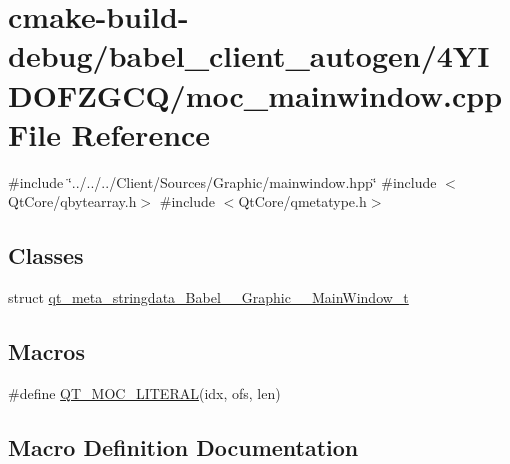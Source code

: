 \hypertarget{cmake-build-debug_2babel__client__autogen_24YIDOFZGCQ_2moc__mainwindow_8cpp}{}\section{cmake-\/build-\/debug/babel\+\_\+client\+\_\+autogen/4\+Y\+I\+D\+O\+F\+Z\+G\+C\+Q/moc\+\_\+mainwindow.cpp File Reference}
\label{cmake-build-debug_2babel__client__autogen_24YIDOFZGCQ_2moc__mainwindow_8cpp}
{\ttfamily \#include \char`\"{}../../../\+Client/\+Sources/\+Graphic/mainwindow.\+hpp\char`\"{}}\newline
{\ttfamily \#include $<$Qt\+Core/qbytearray.\+h$>$}\newline
{\ttfamily \#include $<$Qt\+Core/qmetatype.\+h$>$}\newline
\subsection*{Classes}
\begin{DoxyCompactItemize}
\item 
struct \hyperlink{structqt__meta__stringdata__Babel____Graphic____MainWindow__t}{qt\+\_\+meta\+\_\+stringdata\+\_\+\+Babel\+\_\+\+\_\+\+Graphic\+\_\+\+\_\+\+Main\+Window\+\_\+t}
\end{DoxyCompactItemize}
\subsection*{Macros}
\begin{DoxyCompactItemize}
\item 
\#define \hyperlink{cmake-build-debug_2babel__client__autogen_24YIDOFZGCQ_2moc__mainwindow_8cpp_a75bb9482d242cde0a06c9dbdc6b83abe}{Q\+T\+\_\+\+M\+O\+C\+\_\+\+L\+I\+T\+E\+R\+AL}(idx,  ofs,  len)
\end{DoxyCompactItemize}


\subsection{Macro Definition Documentation}
\mbox{\label{cmake-build-debug_2babel__client__autogen_24YIDOFZGCQ_2moc__mainwindow_8cpp_a75bb9482d242cde0a06c9dbdc6b83abe}} 

